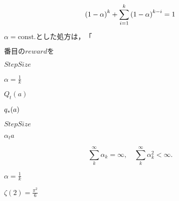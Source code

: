 \documentclass[10pt]{book}
\begin{document}
\begin{mdSnippets}
\begin{mdDisplaySnippet}[7080414a6c853398713420945d15c0c0]
\[\left( {1-\alpha} \right)^k + \sum_{i=1}^{k}\left( {1-\alpha} \right)^{k-i} = 1
\]%
\end{mdDisplaySnippet}%
\begin{mdInlineSnippet}[6f051a80df7b0b0387853ab14b2dadd4]%
$\alpha = \text{const.}とした処方は，「$\end{mdInlineSnippet}%
\begin{mdInlineSnippet}%
$番目のrewardを$\end{mdInlineSnippet}%
\begin{mdInlineSnippet}[071449462d0c247e47313eb8c3129dd0]%
$StepSize$\end{mdInlineSnippet}%
\begin{mdInlineSnippet}[8a9df5a470f0ff7701b1ddfb813f9a74]%
$\alpha = \frac{1}{k}$\end{mdInlineSnippet}%
\begin{mdInlineSnippet}%
$Q_t(a)$\end{mdInlineSnippet}%
\begin{mdInlineSnippet}[51ea1d83a184a2f1d8ae7841635411b3]%
$q_*(a)$\end{mdInlineSnippet}%
\begin{mdInlineSnippet}[071449462d0c247e47313eb8c3129dd0]%
$StepSize$\end{mdInlineSnippet}%
\begin{mdInlineSnippet}[bbbff5056a47f21dd016cf0cf2e02154]%
$\alpha_t{a}$\end{mdInlineSnippet}%
\begin{mdDisplaySnippet}[21dcf4764218a084aa1d964ec5e477a0]%
\[%
\sum_k^\infty \alpha_k = \infty, \quad \sum_k^\infty \alpha^2_k < \infty.
\]%
\end{mdDisplaySnippet}%
\begin{mdInlineSnippet}[8a9df5a470f0ff7701b1ddfb813f9a74]%
$\alpha = \frac{1}{k}$\end{mdInlineSnippet}%
\begin{mdInlineSnippet}[ce726bc352ca7d54bb815229bf0c151e]%
$\zeta(2) = \frac{\pi^2}{6}$\end{mdInlineSnippet}%
\begin{mdInlineSnippet}[c5a9e2125eb54d34c38ce504ce9e21c1]%

\end{mdInlineSnippet}
\end{mdSnippets}
\end{document}

